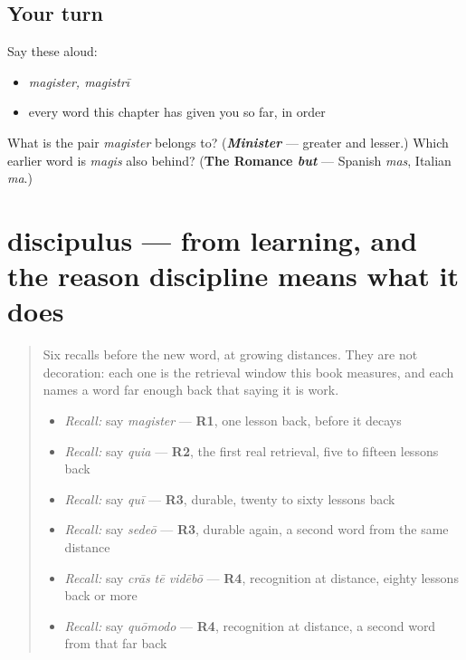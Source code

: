 \subsection*{Your turn}
Say these aloud:

\begin{itemize}
\raggedright
  \item \emph{magister, magistrī}
  \item every word this chapter has given you so far, in order
\end{itemize}

\begin{tcolorbox}[breakable,colback=teal!4,colframe=teal!35!black,title={Before you move on}]
What is the pair \emph{magister} belongs to? (\emph{\textbf{Minister}} — greater and lesser.) Which earlier word is \emph{magis} also behind? (\textbf{The Romance \emph{but}} — Spanish \emph{mas}, Italian \emph{ma}.)
\end{tcolorbox}
\section[discipulus, discipulī]{discipulus — from learning, and the reason discipline means what it does}

\label{lesson:LA-C53-discipulus}



\begin{quote}
Six recalls before the new word, at growing distances. They are not decoration: each one is the retrieval window this book measures, and each names a word far enough back that saying it is work.

\begin{itemize}
\raggedright
  \item \emph{Recall:} say \emph{magister} — \textbf{R1}, one lesson back, before it decays
  \item \emph{Recall:} say \emph{quia} — \textbf{R2}, the first real retrieval, five to fifteen lessons back
  \item \emph{Recall:} say \emph{quī} — \textbf{R3}, durable, twenty to sixty lessons back
  \item \emph{Recall:} say \emph{sedeō} — \textbf{R3}, durable again, a second word from the same distance
  \item \emph{Recall:} say \emph{crās tē vidēbō} — \textbf{R4}, recognition at distance, eighty lessons back or more
  \item \emph{Recall:} say \emph{quōmodo} — \textbf{R4}, recognition at distance, a second word from that far back
\end{itemize}
\end{quote}

